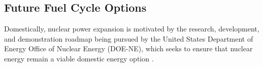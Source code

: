 


\subsection{Future Fuel Cycle Options}


Domestically, nuclear power expansion is motivated by the research, development, 
and demonstration roadmap being pursued by the United States Department of 
Energy Office of Nuclear Energy (DOE-NE), which seeks to ensure that nuclear 
energy remain a viable domestic energy option \cite{doe_nuclear_2010}. 


